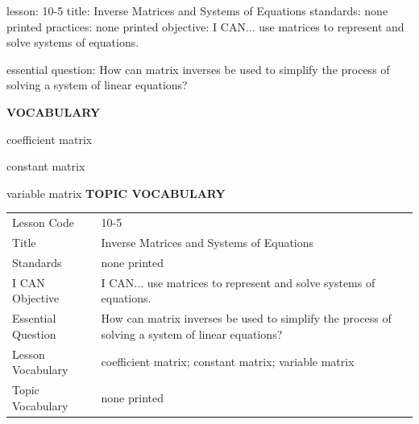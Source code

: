 \documentclass{article}
\newenvironment{lesson-meta}{}{}        %
\newcommand{\te}[1]{}                   %
\begin{document}
\begin{lesson-meta}
lesson: 10-5
title: Inverse Matrices and Systems of Equations
standards: none printed
practices: none printed
objective: I CAN... use matrices to represent and solve systems of equations.

essential question: How can matrix inverses be used to simplify the process of solving a system of linear equations?

\textbf{VOCABULARY}
\item coefficient matrix
\item constant matrix
\item variable matrix
\textbf{TOPIC VOCABULARY}
\te{No separate topic vocabulary list is printed on these lesson pages.}
\begin{tabular}{ll}
Lesson Code & 10-5 \\
Title & Inverse Matrices and Systems of Equations \\
Standards & none printed \\
I CAN Objective & I CAN... use matrices to represent and solve systems of equations. \\
Essential Question & How can matrix inverses be used to simplify the process of solving a system of linear equations? \\
Lesson Vocabulary & coefficient matrix; constant matrix; variable matrix \\
Topic Vocabulary & none printed \\
\end{tabular}
\end{lesson-meta}
\end{document}
